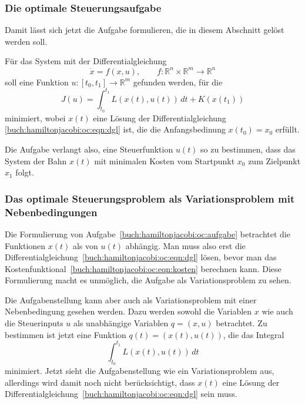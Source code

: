 \subsubsection{Die optimale Steuerungsaufgabe}
Damit lässt sich jetzt die Aufgabe formulieren, die in diesem
Abschnitt gelöst werden soll.

\begin{aufgabe}
\label{buch:hamiltonjacobi:oc:aufgabe}
Für das System mit der Differentialgleichung
\begin{equation}
\dot{x}
=
f(x,u), \qquad f\colon \mathbb{R}^n\times\mathbb{R}^m\to\mathbb{R}^n
\label{buch:hamiltonjacobi:oc:eqn:dgl}
\end{equation}
soll eine Funktion $u\colon [t_0,t_1]\to\mathbb{R}^m$ gefunden werden,
für die 
\begin{equation}
J(u)
=
\int_{t_0}^{t_1}
L(x(t),u(t))
\,dt
+
K(x(t_1))
\label{buch:hamiltonjacobi:oc:eqn:kosten}
\end{equation}
minimiert, wobei $x(t)$ eine Lösung der Differentialgleichung
\eqref{buch:hamiltonjacobi:oc:eqn:dgl} ist, die die Anfangsbedinung
$x(t_0)=x_0$ erfüllt.
\end{aufgabe}

Die Aufgabe verlangt also, eine Steuerfunktion $u(t)$ so zu bestimmen,
dass das System der Bahn $x(t)$ mit minimalen Kosten vom Startpunkt $x_0$
zum Zielpunkt $x_1$ folgt.

%
%
\subsubsection{Das optimale Steuerungsproblem als Variationsproblem
mit Nebenbedingungen}
Die Formulierung von Aufgabe~\ref{buch:hamiltonjacobi:oc:aufgabe}
betrachtet die Funktionen $x(t)$ als von $u(t)$ abhängig.
Man muss also erst die
Differentialgleichung~\eqref{buch:hamiltonjacobi:oc:eqn:dgl}
lösen, bevor man das
Kostenfunktional~\eqref{buch:hamiltonjacobi:oc:eqn:kosten}
berechnen kann.
%
Diese Formulierung macht es unmöglich, die Aufgabe als 
Variationsproblem zu sehen.

Die Aufgabenstellung kann aber auch als Variationsproblem mit
einer Nebenbedingung gesehen werden.
Dazu werden sowohl die Variablen $x$ wie auch die Steuerinputs $u$
als unabhängige Variablen $q=(x,u)$ betrachtet.
Zu bestimmen ist jetzt eine Funktion $q(t)=(x(t),u(t))$, die
das Integral
\[
\int_{t_0}^{t_1}
L(x(t), u(t))
\,dt
\]
minimiert.
Jetzt sieht die Aufgabenstellung wie ein Variationsproblem aus,
allerdings wird damit noch nicht berücksichtigt, dass $x(t)$ eine
Lösung der Differentialgleichung~\eqref{buch:hamiltonjacobi:oc:eqn:dgl}
sein muss.

